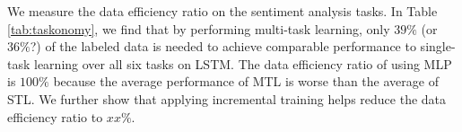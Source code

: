 
We measure the data efficiency ratio on the sentiment analysis tasks.
In Table \ref{tab:taskonomy}, we find that by performing multi-task learning, only $39\%$ ({\cor or $36\%$?}) of the labeled data is needed to achieve comparable performance to single-task learning over all six tasks on LSTM.
The data efficiency ratio of using MLP is $100\%$ because the average performance of MTL is worse than the average of STL.
We further show that applying incremental training helps reduce the data efficiency ratio to \alert{$xx\%$}.


